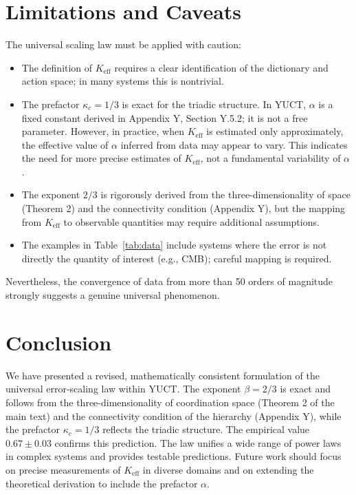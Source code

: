 \documentclass[12pt]{article}
\newcommand{\Keff}{K_{\mathrm{eff}}}
\newcommand{\kappac}{\kappa_c}
\begin{document}
	\section{Limitations and Caveats}
	\label{sec:limitations}
	
	The universal scaling law must be applied with caution:
	\begin{itemize}
		\item The definition of \(\Keff\) requires a clear identification of the dictionary and action space; in many systems this is nontrivial.
		\item The prefactor \(\kappac = 1/3\) is exact for the triadic structure. In YUCT, \(\alpha\) is a fixed constant derived in Appendix Y, Section Y.5.2; it is not a free parameter. However, in practice, when \(\Keff\) is estimated only approximately, the effective value of \(\alpha\) inferred from data may appear to vary. This indicates the need for more precise estimates of \(\Keff\), not a fundamental variability of \(\alpha\).
		\item The exponent \(2/3\) is rigorously derived from the three-dimensionality of space (Theorem 2) and the connectivity condition (Appendix Y), but the mapping from \(\Keff\) to observable quantities may require additional assumptions.
		\item The examples in Table~\ref{tab:data} include systems where the error is not directly the quantity of interest (e.g., CMB); careful mapping is required.
	\end{itemize}
	
	Nevertheless, the convergence of data from more than 50 orders of magnitude strongly suggests a genuine universal phenomenon.
	
	\section{Conclusion}
	We have presented a revised, mathematically consistent formulation of the universal error-scaling law within YUCT. The exponent \(\beta = 2/3\) is exact and follows from the three-dimensionality of coordination space (Theorem 2 of the main text) and the connectivity condition of the hierarchy (Appendix Y), while the prefactor \(\kappac = 1/3\) reflects the triadic structure. The empirical value \(0.67 \pm 0.03\) confirms this prediction. The law unifies a wide range of power laws in complex systems and provides testable predictions. Future work should focus on precise measurements of \(\Keff\) in diverse domains and on extending the theoretical derivation to include the prefactor \(\alpha\).
	
\end{document}
